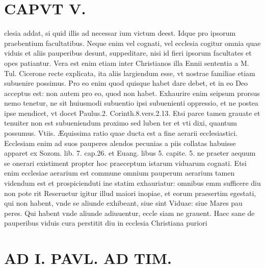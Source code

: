 \documentclass{article}
\begin{document}
\begin{pages}
\section*{CAPVT  V. }
\marginpar{[ p.303 ]}\pstart clesia addat, si quid illis ad necessar ium victum deest. Idque pro ipsorum praebentium facultatibus. Neque enim vel cognati, vel ecclesia cogitur omnia quae viduis et aliis pauperibus desunt, suppeditare, nisi id fieri ipsorum facultates et opes patiantur. Vera est enim etiam inter Christianos illa Ennii sententia a M. Tul. Cicerone recte explicata, ita aliis largiendum esse, vt nostrae familiae etiam subuenire possimus. Pro eo enim quod quisque habet dare debet, et in eo Deo acceptus est: non autem pro eo, quod non habet. Exhaurire enim seipsum prorsus nemo tenetur, ne sit huiusmodi subuentio ipsi subuenienti oppressio, et ne postea ipse mendicet, vt docet Paulus.2. Corinth.8.vers.2.13. Etsi parce tamen grauate et tenuiter non est subueniendum proximo sed luben ter et vti dixi, quantum possumus. Vtiis. Æquissima ratio quae ducta est a fine aerarii ecclesiastici. Ecclesiam enim ad suos pauperes alendos pecunias a piis collatas habuisse apparet ex Sozom. lib.  7. cap.26. et Euang. libus  5. capite. 5. ne praeter aequum se onerari existiment propter hoc praeceptum istarum viduarum cognati. Etsi enim ecclesiae aerarium est commune omnium pauperum aerarium tamen videndum est et prospicienduti ine statim exhauriatur: omnibus emm sufficere diu non pote rit Reseruetur igitur illud maiori inopiae, et eorum praesertim egestati, qui non habent, vnde se aliunde exhibeant, siue sint Viduae: siue Mares pau peres. Qui habent vnde aliunde adiuuentur, eccle siam ne grauent. Haec sane de pauperibus viduis cura perstitit diu in ecclesia Christiana puriori\pend
\section*{AD I. PAVL. AD TIM. }
\marginpar{[ p.304 ]}\pstart {}
{}

\end{pages}
\end{document}
